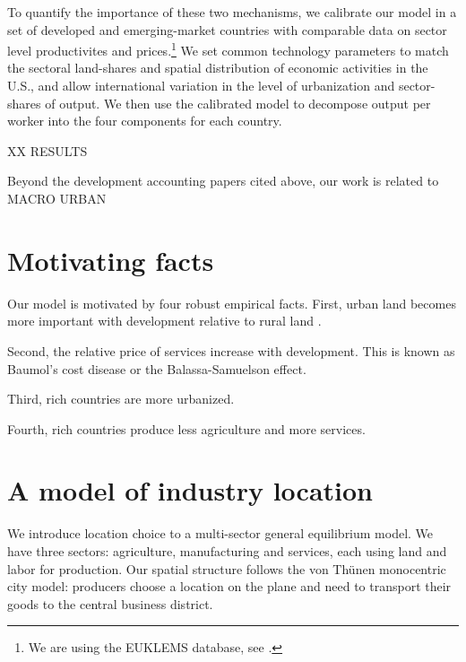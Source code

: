 \documentclass[12pt]{article}
\begin{document}
To quantify the importance of these two mechanisms, we calibrate our model in a set of developed and emerging-market countries with comparable data on sector level productivites and prices.\footnote{We are using the EUKLEMS database, see .} We set common technology parameters to match the sectoral land-shares and spatial distribution of economic activities in the U.S., and allow international variation in the level of urbanization and sector-shares of output. We then use the calibrated model to decompose output per worker into the four components for each country.

XX RESULTS

\bigskip

Beyond the development accounting papers cited above, our work is related to MACRO URBAN


\section{Motivating facts}
Our model is motivated by four robust empirical facts. First, urban land becomes more important with development relative to rural land \cite[Figure 10.3]{Clark}.

Second, the relative price of services increase with development. This is known as Baumol's cost disease or the Balassa-Samuelson effect.

Third, rich countries are more urbanized.

Fourth, rich countries produce less agriculture and more services.


\section{A model of industry location}
We introduce location choice to a multi-sector general equilibrium model. We have three sectors: agriculture, manufacturing and services, each using land and labor for production. Our spatial structure follows the von Thünen monocentric city model: producers choose a location on the plane and need to transport their goods to the central business district. %
\end{document}
